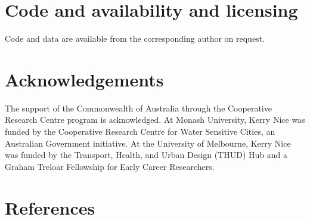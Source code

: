 \documentclass[final,3p,times,authoryear]{elsarticle}
\begin{document}
\section{Code and availability and licensing}\label{sec:available}
Code and data are available from the corresponding author on request.






\section*{Acknowledgements}
The support of the Commonwealth of Australia through the Cooperative Research Centre program is acknowledged. At Monash University, Kerry Nice was funded by the Cooperative Research Centre for Water Sensitive Cities, an Australian Government initiative. At the University of Melbourne, Kerry Nice was funded by the Transport, Health, and Urban Design (THUD) Hub and a Graham Treloar Fellowship for Early Career Researchers.
 

\section*{References}\label{sec:ref}
   
  


%
%
%


\end{document}
